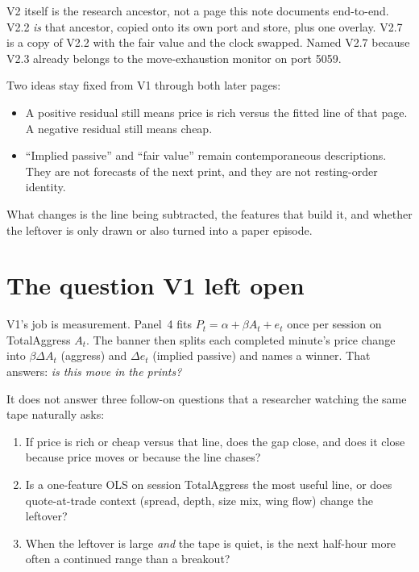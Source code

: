 \documentclass[11pt]{article}
\begin{document}
V2 itself is the research ancestor, not a page this note documents
end-to-end.  V2.2 \emph{is} that ancestor, copied onto its own port
and store, plus one overlay.  V2.7 is a copy of V2.2 with the fair
value and the clock swapped.  Named V2.7 because V2.3 already belongs
to the move-exhaustion monitor on port 5059.

Two ideas stay fixed from V1 through both later pages:

\begin{itemize}
    \item A positive residual still means price is rich versus the
    fitted line of that page.  A negative residual still means cheap.
    \item ``Implied passive'' and ``fair value'' remain
    contemporaneous descriptions.  They are not forecasts of the next
    print, and they are not resting-order identity.
\end{itemize}

What changes is the line being subtracted, the features that build
it, and whether the leftover is only drawn or also turned into a
paper episode.


\section{The question V1 left open}

V1's job is measurement.  Panel~4 fits
\(P_t=\alpha+\beta A_t+e_t\) once per session on TotalAggress
\(A_t\).  The banner then splits each completed minute's price change
into \(\beta\Delta A_t\) (aggress) and \(\Delta e_t\) (implied
passive) and names a winner.  That answers: \emph{is this move in the
prints?}

It does not answer three follow-on questions that a researcher
watching the same tape naturally asks:

\begin{enumerate}
    \item If price is rich or cheap versus that line, does the gap
    close, and does it close because price moves or because the line
    chases?
    \item Is a one-feature OLS on session TotalAggress the most
    useful line, or does quote-at-trade context (spread, depth, size
    mix, wing flow) change the leftover?
    \item When the leftover is large \emph{and} the tape is quiet,
    is the next half-hour more often a continued range than a
    breakout?
\end{enumerate}
\end{document}
